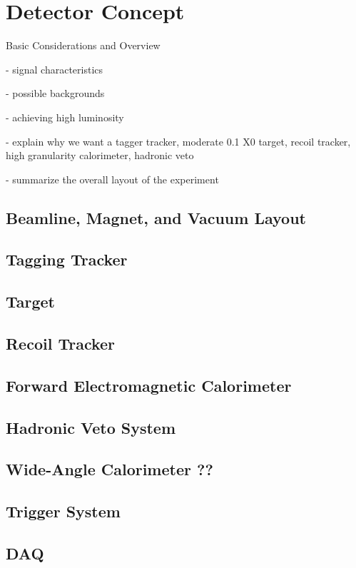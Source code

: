 \section{Detector Concept}

Basic Considerations and Overview

- signal characteristics 

- possible backgrounds 

- achieving high luminosity 

- explain why we want a tagger tracker, moderate 0.1 X0 target, recoil tracker, high granularity calorimeter, hadronic veto

- summarize the overall layout of the experiment 

\subsection{Beamline, Magnet, and Vacuum Layout}

\subsection{Tagging Tracker}

\subsection{Target}

\subsection{Recoil Tracker}

\subsection{Forward Electromagnetic Calorimeter}

\subsection{Hadronic Veto System}

\subsection{Wide-Angle Calorimeter ??}

\subsection{Trigger System}

\subsection{DAQ}
